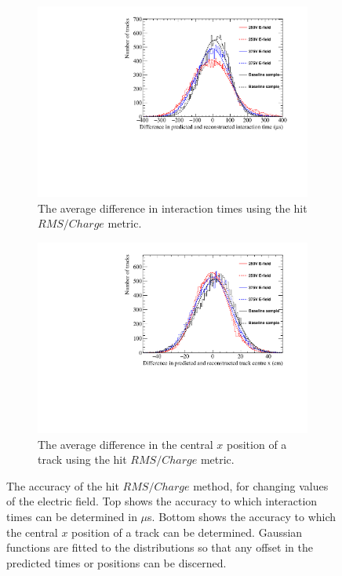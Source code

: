 \begin{figure}
  \centering
  \begin{subfigure}{0.6\textwidth}
    \centering
    \includegraphics[width=\textwidth]{Canvas_AvDiff_T_RMS_Q_ElecField}
    \caption{The average difference in interaction times using the hit $RMS/Charge$ metric.}
    \label{fig:DiffElecStudy_AvDiff_RMS_Int_T}
  \end{subfigure}
  \begin{subfigure}{0.6\textwidth}
    \centering
    \includegraphics[width=\textwidth]{Canvas_AvDiff_X_RMS_Q_ElecField}
    \caption{The average difference in the central $x$ position of a track using the hit $RMS/Charge$ metric.}
    \label{fig:DiffElecStudy_AvDiff_RMS_Int_X}
  \end{subfigure}
  \caption[Comparing the accuracy of the hit $RMS$ method, as the electric field changes]
          {The accuracy of the hit $RMS/Charge$ method, for changing values of the electric field. Top shows the accuracy to which interaction times can be determined in $\mu$s. Bottom shows the accuracy to which the central $x$ position of a track can be determined. Gaussian functions are fitted to the distributions so that any offset in the predicted times or positions can be discerned.}
  \label{fig:DiffElecStudy_AvDiff_RMS_Int}
\end{figure}

